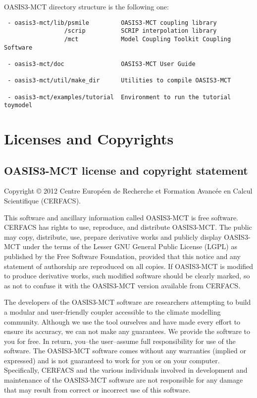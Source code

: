 OASIS3-MCT directory structure is the following one:

\begin{verbatim}
 - oasis3-mct/lib/psmile         OASIS3-MCT coupling library
                 /scrip          SCRIP interpolation library
                 /mct            Model Coupling Toolkit Coupling Software
                  
 - oasis3-mct/doc                OASIS3-MCT User Guide

 - oasis3-mct/util/make_dir      Utilities to compile OASIS3-MCT

 - oasis3-mct/examples/tutorial  Environment to run the tutorial toymodel
\end{verbatim}

\section{Licenses and Copyrights}
 
\subsection{OASIS3-MCT license and copyright statement}

Copyright © 2012 Centre Europ\'een de Recherche et Formation
Avanc\'ee en Calcul Scientifique (CERFACS).  

This software and ancillary information called OASIS3-MCT is free
software.  CERFACS has rights to use, reproduce, and distribute
OASIS3-MCT. The public may copy, distribute, use, prepare derivative works and
publicly display OASIS3-MCT under the terms of the Lesser GNU General
Public License (LGPL) as published by the Free Software Foundation,
provided that this notice and any statement of authorship are
reproduced on all copies. If OASIS3-MCT is modified to produce derivative
works, such modified software should be clearly marked, so as not to
confuse it with the OASIS3-MCT version available from CERFACS.

The developers of the OASIS3-MCT software are researchers attempting to
build a modular and user-friendly coupler accessible to the climate
modelling community. Although we use the tool ourselves and have made
every effort to ensure its accuracy, we can not make any
guarantees. We provide the software to you for free. In return,
you--the user--assume full responsibility for use of the software. The
OASIS3-MCT software comes without any warranties (implied or expressed) and
is not guaranteed to work for you or on your computer. Specifically,
CERFACS and the various individuals involved in development and
maintenance of the OASIS3-MCT software are not responsible for any damage
that may result from correct or incorrect use of this software.

